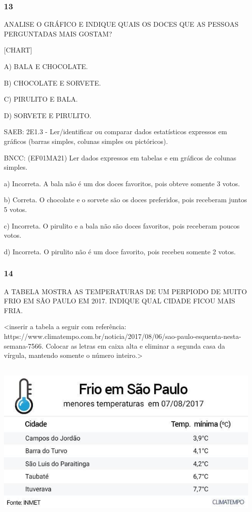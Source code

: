 \subsubsection{13}\label{section-99}

ANALISE O GRÁFICO E INDIQUE QUAIS OS DOCES QUE AS PESSOAS PERGUNTADAS
MAIS GOSTAM?

{{[}CHART{]}}

A) BALA E CHOCOLATE.

B) CHOCOLATE E SORVETE.

C) PIRULITO E BALA.

D) SORVETE E PIRULITO.

SAEB: 2E1.3 - Ler/identificar ou comparar dados estatísticos expressos
em gráficos (barras simples, colunas simples ou pictóricos).

BNCC: (EF01MA21) Ler dados expressos em tabelas e em gráficos de colunas
simples.

a) Incorreta. A bala não é um dos doces favoritos, pois obteve somente 3
votos.

b) Correta. O chocolate e o sorvete são os doces preferidos, pois
receberam juntos 5 votos.

c) Incorreta. O pirulito e a bala não são doces favoritos, pois
receberam poucos votos.

d) Incorreta. O pirulito não é um doce favorito, pois recebeu somente 2
votos.

\subsubsection{14}\label{section-100}

A TABELA MOSTRA AS TEMPERATURAS DE UM PERPIODO DE MUITO FRIO EM SÃO
PAULO EM 2017. INDIQUE QUAL CIDADE FICOU MAIS FRIA.

\textless{}inserir a tabela a seguir com referência:
https://www.climatempo.com.br/noticia/2017/08/06/sao-paulo-esquenta-nesta-semana-7566.
Colocar as letras em caixa alta e eliminar a segunda casa da vírgula,
mantendo somente o número inteiro.\textgreater{}

\includegraphics[width=5.90556in,height=3.20208in]{media/image110.jpg}

